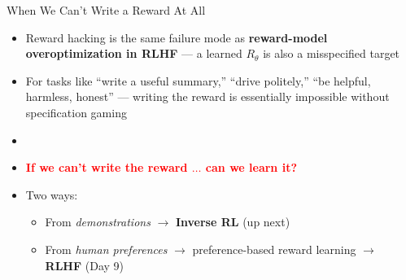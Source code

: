 \begin{frame}{When We Can't Write a Reward At All}
\begin{itemize}
    \setlength{\itemsep}{0.7em}
    \item Reward hacking is the same failure mode as \textbf{reward-model overoptimization in RLHF} --- a learned $R_\theta$ is also a misspecified target
    \item For tasks like ``write a useful summary,'' ``drive politely,'' ``be helpful, harmless, honest'' --- writing the reward is essentially impossible without specification gaming
    \item[]
    \item \textcolor{red}{\textbf{If we can't write the reward $\ldots$ can we learn it?}}
    \item Two ways:
    \begin{itemize}
        \item From \emph{demonstrations} $\longrightarrow$ \textbf{Inverse RL} (up next)
        \item From \emph{human preferences} $\longrightarrow$ preference-based reward learning $\longrightarrow$ \textbf{RLHF} (Day 9)
    \end{itemize}
\end{itemize}
\end{frame}
